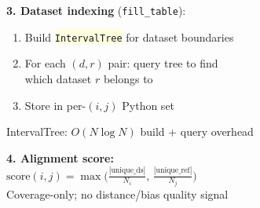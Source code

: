 \documentclass[8pt]{article}
\newlength{\colw}
\begin{document}
\begin{minipage}[t]{\colw}
\begin{warnbox}
\textbf{3. Dataset indexing} (\texttt{fill\_table}):
\begin{enumerate}[leftmargin=1em, itemsep=0pt, topsep=1pt, parsep=0pt]
\item Build \colorbox{lightyellow}{\texttt{IntervalTree}} for dataset boundaries
\item For each $(d, r)$ pair: query tree to find\\
    which dataset $r$ belongs to
\item Store in per-$(i,j)$ Python set
\end{enumerate}
{\scriptsize\color{removed} IntervalTree: $O(N\log N)$ build + query overhead}
\end{warnbox}\vspace{1pt}

\begin{stepbox}
\textbf{4. Alignment score:}\\
$\text{score}(i,j) = \max\!\big(\frac{|\text{unique\_ds}|}{N_i},\, \frac{|\text{unique\_ref}|}{N_j}\big)$\\
{\scriptsize Coverage-only; no distance/bias quality signal}
\end{stepbox}
\end{minipage}%
\hfill
\end{document}
